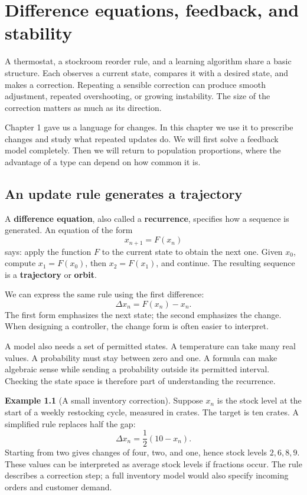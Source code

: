 \documentclass[11pt,oneside,openany]{book}
\theoremstyle{definition}
\newtheorem{example}{Example}[chapter]
\theoremstyle{remark}
\numberwithin{equation}{chapter}
\begin{document}
\FloatBarrier

\chapter{Difference equations, feedback, and stability}
A thermostat, a stockroom reorder rule, and a learning algorithm share a basic structure. Each observes a current state, compares it with a desired state, and makes a correction. Repeating a sensible correction can produce smooth adjustment, repeated overshooting, or growing instability. The size of the correction matters as much as its direction.

Chapter 1 gave us a language for changes. In this chapter we use it to prescribe changes and study what repeated updates do. We will first solve a feedback model completely. Then we will return to population proportions, where the advantage of a type can depend on how common it is.

\section{An update rule generates a trajectory}\label{ch02-an-update-rule-generates-a-trajectory}

A \textbf{difference equation}, also called a \textbf{recurrence}, specifies how a sequence is generated. An equation of the form \[x_{n+1}=F(x_n)\] says: apply the function \(F\) to the current state to obtain the next one. Given \(x_0\), compute \(x_1=F(x_0)\), then \(x_2=F(x_1)\), and continue. The resulting sequence is a \textbf{trajectory} or \textbf{orbit}.

We can express the same rule using the first difference: \[\Delta x_n=F(x_n)-x_n.\] The first form emphasizes the next state; the second emphasizes the change. When designing a controller, the change form is often easier to interpret.

A model also needs a set of permitted states. A temperature can take many real values. A probability must stay between zero and one. A formula can make algebraic sense while sending a probability outside its permitted interval. Checking the state space is therefore part of understanding the recurrence.

\begin{example}[A small inventory correction]

Suppose \(x_n\) is the stock level at the start of a weekly restocking cycle, measured in crates. The target is ten crates. A simplified rule replaces half the gap: \[\Delta x_n=\frac12(10-x_n).\] Starting from two gives changes of four, two, and one, hence stock levels \(2,6,8,9\). These values can be interpreted as average stock levels if fractions occur. The rule describes a correction step; a full inventory model would also specify incoming orders and customer demand.

\end{example}
\end{document}
